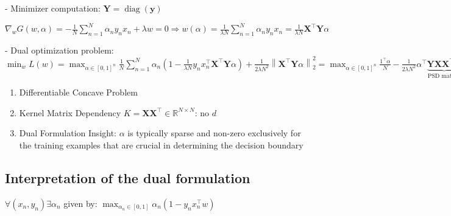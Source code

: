 - Minimizer computation:
$
\mathbf{Y}=\operatorname{diag}(\mathbf{y})
$

$\nabla_{w} G(w, \alpha)=-\frac{1}{N} \sum_{n=1}^{N} \alpha_{n} y_{n} x_{n}+\lambda w=0 \Longrightarrow w(\alpha)=\frac{1}{\lambda N} \sum_{n=1}^{N} \alpha_{n} y_{n} x_{n}=\frac{1}{\lambda N} \mathbf{X}^{\top} \mathbf{Y} \alpha$

- Dual optimization problem:
$
\min _{w} L(w) =\max _{\alpha \in[0,1]^{n}} \frac{1}{N} \sum_{n=1}^{N} \alpha_{n}\left(1-\frac{1}{\lambda N} y_{n} x_{n}^{\top} \mathbf{X}^{\top} \mathbf{Y} \alpha\right)+\frac{1}{2 \lambda N^{2}}\left\|\mathbf{X}^{\top} \mathbf{Y} \alpha\right\|_{2}^{2} 
=\max _{\alpha \in[0,1]^{n}} \frac{1^{\top} \alpha}{N}-\frac{1}{2 \lambda N^{2}} \alpha^{\top} \underbrace{\mathbf{Y} \mathbf{X} \mathbf{X}^{\top} \mathbf{Y}}_{\text {PSD matrix }} \alpha
$



\begin{enumerate}
  \item Differentiable Concave Problem

  \item Kernel Matrix Dependency $K=\mathbf{X} \mathbf{X}^{\top} \in \mathbb{R}^{N \times N}$: no $d$

  \item Dual Formulation Insight: $\alpha$ is typically sparse and non-zero exclusively for the training examples that are crucial in determining the decision boundary

\end{enumerate}

\subsection*{Interpretation of the dual formulation}
$\forall \left(x_{n}, y_{n}\right) \exists \alpha_{n}$ given by:
$
\max _{\alpha_{n} \in[0,1]} \alpha_{n}\left(1-y_{n} x_{n}^{\top} w\right)
$


